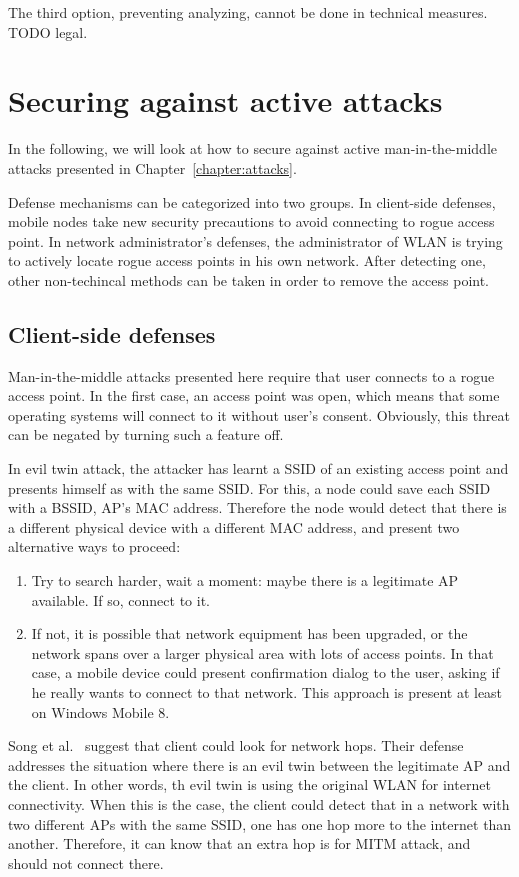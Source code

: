 \documentclass[12pt,a4paper,oneside,pdftex]{report}
\begin{document}
The third option, preventing analyzing, cannot be done in technical measures. TODO legal.


\section{Securing against active attacks}

In the following, we will look at how to secure against active man-in-the-middle attacks presented in Chapter~\ref{chapter:attacks}. 

Defense mechanisms can be categorized into two groups. In client-side defenses, mobile nodes take new security precautions to avoid connecting to rogue access point. In network administrator's defenses, the administrator of WLAN is trying to actively locate rogue access points in his own network. After detecting one, other non-techincal methods can be taken in order to remove the access point.

\subsection{Client-side defenses}

Man-in-the-middle attacks presented here require that user connects to a rogue access point. In the first case, an access point was open, which means that some operating systems will connect to it without user's consent. Obviously, this threat can be negated by turning such a feature off. 

In evil twin attack, the attacker has learnt a SSID of an existing access point and presents himself as with the same SSID. For this, a node could save each SSID with a BSSID, AP's MAC address. Therefore the node would detect that there is a different physical device with a different MAC address, and present two alternative ways to proceed:
\begin{enumerate}
    \item Try to search harder, wait a moment: maybe there is a legitimate AP available. If so, connect to it.
    \item If not, it is possible that network equipment has been upgraded, or the network spans over a larger physical area with lots of access points. In that case, a mobile device could present confirmation dialog to the user, asking if he really wants to connect to that network. This approach is present at least on Windows Mobile 8.
\end{enumerate}

Song et al.~\cite{song2010peeping} suggest that client could look for network hops. Their defense addresses the situation where there is an evil twin between the legitimate AP and the client. In other words, th evil twin is using the original WLAN for internet connectivity. When this is the case, the client could detect that in a network with two different APs with the same SSID, one has one hop more to the internet than another. Therefore, it can know that an extra hop is for MITM attack, and should not connect there.
\end{document}
